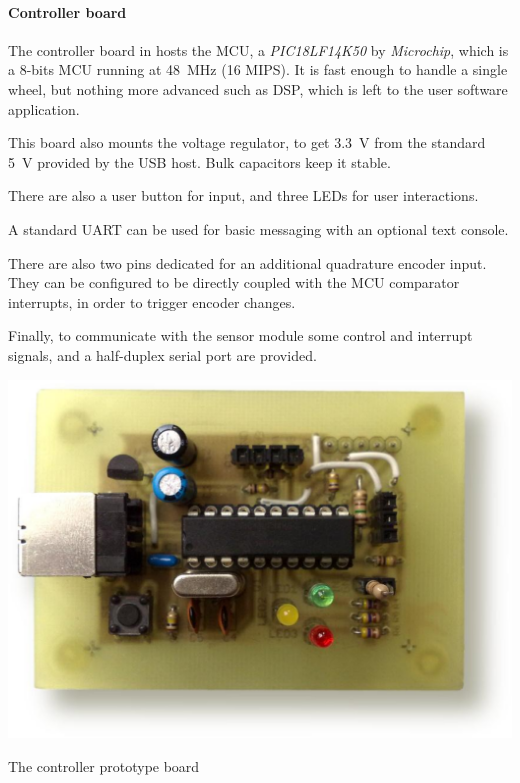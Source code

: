 \documentclass[a4paper,10pt]{article}
\makeatletter
\newenvironment{figurehere}{\def\@captype{figure}\vspace{2ex}}{\vspace{2ex}}
\makeatother
\begin{document}
\begin{multicols}{2}
\paragraph{Controller board}
The controller board in  hosts the MCU, a
\emph{PIC18LF14K50} \cite{microchip_pic18lf14k50} by \emph{Microchip}, which
is a 8-bits MCU running at 48~MHz (16 MIPS). It is fast enough to handle a
single wheel, but nothing more advanced such as DSP, which is left to the
user software application.

This board also mounts the voltage regulator, to get 3.3~V from the standard
5~V provided by the USB host. Bulk capacitors keep it stable.

There are also a user button for input, and three LEDs for user interactions.

A standard UART can be used for basic messaging with an optional text console.

There are also two pins dedicated for an additional quadrature encoder input.
They can be configured to be directly coupled with the MCU comparator
interrupts, in order to trigger encoder changes.

Finally, to communicate with the sensor module some control and interrupt
signals, and a half-duplex serial port are provided.

\begin{figurehere}
	\centering
	\includegraphics[keepaspectratio=true,width=\columnwidth]{images/board_photo.pdf}
	\caption{The controller prototype board}
	\label{fig:board_photo}
\end{figurehere}



\end{multicols}
\end{document}
